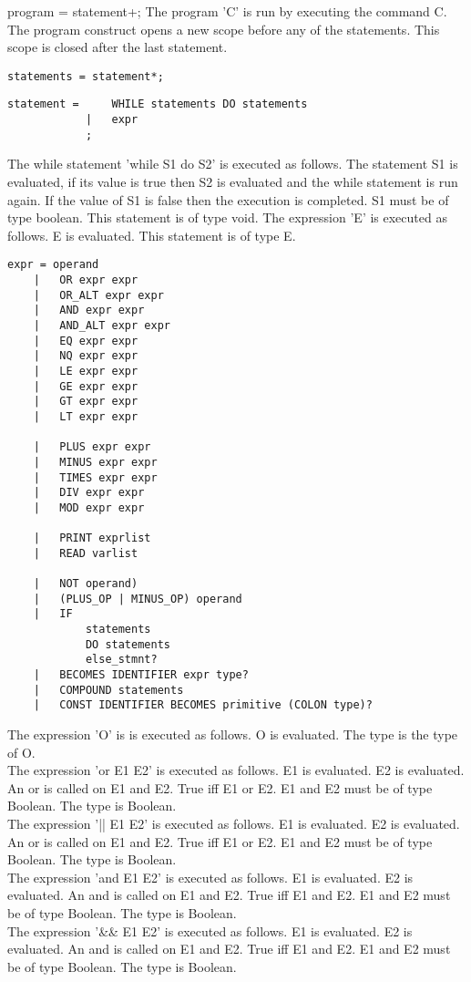 \documentclass[paper=a4, fontsize=11pt]{article}
\numberwithin{equation}{section}		%
\numberwithin{figure}{section}			%
\numberwithin{table}{section}				%
\begin{document}
program = statement+;
The program 'C' is run by executing the command C.
The program construct opens a new scope before any of the statements. This scope is closed after the last statement.
\begin{verbatim}
statements = statement*;
\end{verbatim}
\begin{verbatim}
statement = 	WHILE statements DO statements
			|	expr
			;
\end{verbatim}
The while statement 'while S1 do S2' is executed as follows. The statement S1 is evaluated, if its value is true then S2 is evaluated and the while statement is run again. If the value of S1 is false then the execution is completed. S1 must be of type boolean. This statement is of type void.
The expression 'E' is executed as follows. E is evaluated. This statement is of type E.

\begin{verbatim}
expr = operand
	|	OR expr expr
    |   OR_ALT expr expr
    |   AND expr expr
    |   AND_ALT expr expr
    |   EQ expr expr
   	|   NQ expr expr
   	|   LE expr expr
   	|   GE expr expr
   	|   GT expr expr
   	|   LT expr expr
	
	|   PLUS expr expr
    |   MINUS expr expr
    |   TIMES expr expr
    |   DIV expr expr
    |   MOD expr expr
	
	| 	PRINT exprlist
	| 	READ varlist
	
	| 	NOT operand)
	|	(PLUS_OP | MINUS_OP) operand
	|   IF
   			statements
   			DO statements
   			else_stmnt?
   	|   BECOMES IDENTIFIER expr type?
	|   COMPOUND statements
	|   CONST IDENTIFIER BECOMES primitive (COLON type)?
	\end{verbatim}
The expression 'O' is is executed as follows. O is evaluated. The type is the type of O. \\
The expression 'or E1 E2' is executed as follows. E1 is evaluated. E2 is evaluated. An or is called on E1 and E2. True iff E1 or E2. E1 and E2 must be of type Boolean. The type is Boolean.\\
The expression '|| E1 E2' is executed as follows. E1 is evaluated. E2 is evaluated. An or is called on E1 and E2. True iff E1 or E2. E1 and E2 must be of type Boolean. The type is Boolean.\\
The expression 'and E1 E2' is executed as follows. E1 is evaluated. E2 is evaluated. An and is called on E1 and E2. True iff E1 and E2. E1 and E2 must be of type Boolean. The type is Boolean.\\
The expression '\&\& E1 E2' is executed as follows. E1 is evaluated. E2 is evaluated. An and is called on E1 and E2. True iff E1 and E2. E1 and E2 must be of type Boolean. The type is Boolean.\\
\end{document}
